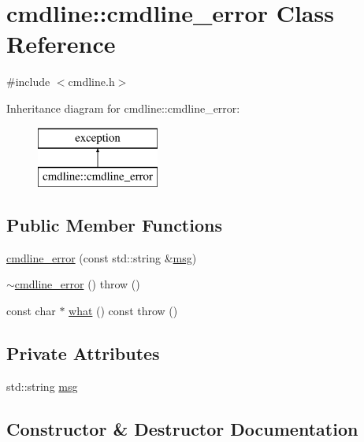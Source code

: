\hypertarget{classcmdline_1_1cmdline__error}{}\section{cmdline\+::cmdline\+\_\+error Class Reference}
\label{classcmdline_1_1cmdline__error}


{\ttfamily \#include $<$cmdline.\+h$>$}

Inheritance diagram for cmdline\+::cmdline\+\_\+error\+:\begin{figure}[H]
\begin{center}
\leavevmode
\includegraphics[height=2.000000cm]{classcmdline_1_1cmdline__error}
\end{center}
\end{figure}
\subsection*{Public Member Functions}
\begin{DoxyCompactItemize}
\item 
\mbox{\hyperlink{classcmdline_1_1cmdline__error_a56748242954e40048c3197a24bdfa036}{cmdline\+\_\+error}} (const std\+::string \&\mbox{\hyperlink{classcmdline_1_1cmdline__error_a46964bd9b018c935fe498a91703183fc}{msg}})
\item 
\mbox{\hyperlink{classcmdline_1_1cmdline__error_a4fb14d65b75bf0dd97a84e76f571a8be}{$\sim$cmdline\+\_\+error}} ()  throw ()
\item 
const char $\ast$ \mbox{\hyperlink{classcmdline_1_1cmdline__error_a95d8810a6a9372dba775829300d9a1cb}{what}} () const  throw ()
\end{DoxyCompactItemize}
\subsection*{Private Attributes}
\begin{DoxyCompactItemize}
\item 
std\+::string \mbox{\hyperlink{classcmdline_1_1cmdline__error_a46964bd9b018c935fe498a91703183fc}{msg}}
\end{DoxyCompactItemize}


\subsection{Constructor \& Destructor Documentation}
\mbox{\label{classcmdline_1_1cmdline__error_a56748242954e40048c3197a24bdfa036}} 
